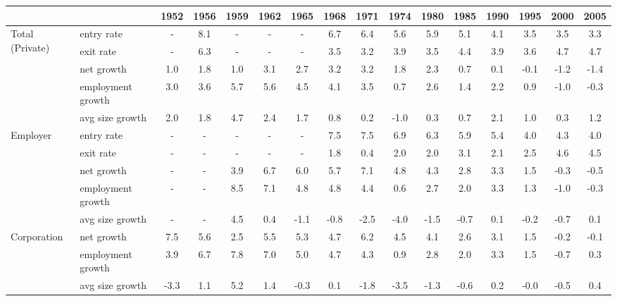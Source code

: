 \begin{tabular}{llcccccccccccccc}
\toprule
            &                 &  1952 & 1956 & 1959 & 1962 &  1965 &  1968 &  1971 &  1974 &  1980 &  1985 &  1990 &  1995 &  2000 &  2005 \\
\midrule
\multirow{5}{*}{Total (Private)} & entry rate &     - &  8.1 &    - &    - &     - &   6.7 &   6.4 &   5.6 &   5.9 &   5.1 &   4.1 &   3.5 &   3.5 &   3.3 \\
            & exit rate &     - &  6.3 &    - &    - &     - &   3.5 &   3.2 &   3.9 &   3.5 &   4.4 &   3.9 &   3.6 &   4.7 &   4.7 \\
            & net growth &   1.0 &  1.8 &  1.0 &  3.1 &   2.7 &   3.2 &   3.2 &   1.8 &   2.3 &   0.7 &   0.1 &  -0.1 &  -1.2 &  -1.4 \\
            & employment growth &   3.0 &  3.6 &  5.7 &  5.6 &   4.5 &   4.1 &   3.5 &   0.7 &   2.6 &   1.4 &   2.2 &   0.9 &  -1.0 &  -0.3 \\
            & avg size growth &   2.0 &  1.8 &  4.7 &  2.4 &   1.7 &   0.8 &   0.2 &  -1.0 &   0.3 &   0.7 &   2.1 &   1.0 &   0.3 &   1.2 \\
\cline{1-16}
\multirow{5}{*}{Employer} & entry rate &     - &    - &    - &    - &     - &   7.5 &   7.5 &   6.9 &   6.3 &   5.9 &   5.4 &   4.0 &   4.3 &   4.0 \\
            & exit rate &     - &    - &    - &    - &     - &   1.8 &   0.4 &   2.0 &   2.0 &   3.1 &   2.1 &   2.5 &   4.6 &   4.5 \\
            & net growth &     - &    - &  3.9 &  6.7 &   6.0 &   5.7 &   7.1 &   4.8 &   4.3 &   2.8 &   3.3 &   1.5 &  -0.3 &  -0.5 \\
            & employment growth &     - &    - &  8.5 &  7.1 &   4.8 &   4.8 &   4.4 &   0.6 &   2.7 &   2.0 &   3.3 &   1.3 &  -1.0 &  -0.3 \\
            & avg size growth &     - &    - &  4.5 &  0.4 &  -1.1 &  -0.8 &  -2.5 &  -4.0 &  -1.5 &  -0.7 &   0.1 &  -0.2 &  -0.7 &   0.1 \\
\cline{1-16}
\multirow{3}{*}{Corporation} & net growth &   7.5 &  5.6 &  2.5 &  5.5 &   5.3 &   4.7 &   6.2 &   4.5 &   4.1 &   2.6 &   3.1 &   1.5 &  -0.2 &  -0.1 \\
            & employment growth &   3.9 &  6.7 &  7.8 &  7.0 &   5.0 &   4.7 &   4.3 &   0.9 &   2.8 &   2.0 &   3.3 &   1.5 &  -0.7 &   0.3 \\
            & avg size growth &  -3.3 &  1.1 &  5.2 &  1.4 &  -0.3 &   0.1 &  -1.8 &  -3.5 &  -1.3 &  -0.6 &   0.2 &  -0.0 &  -0.5 &   0.4 \\

\end{tabular}
